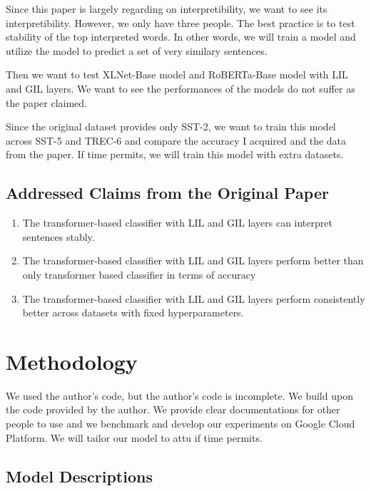 \documentclass{article}
\begin{document}
Since this paper is largely regarding on interpretibility, we want to see its interpretibility. However,
we only have three people. The best practice is to test stability of the top interpreted words.
In other words, we will train a model and utilize the model to predict a set of very similary sentences.

Then we want to test XLNet-Base model and RoBERTa-Base model with LIL and GIL layers. We want to see 
the performances of the models do not suffer as the paper claimed.

Since the original dataset provides only SST-2, we want to train this model across SST-5 and 
TREC-6 and compare the accuracy I acquired and the data from the paper. If time permits, we 
will train this model with extra datasets. 

\subsection{Addressed Claims from the Original Paper} \label{claims}

\begin{enumerate}
    \item The transformer-based classifier with LIL and GIL layers can interpret sentences stably.
    \item The transformer-based classifier with LIL and GIL layers perform better than only transformer
    based classifier in terms of accuracy
    \item The transformer-based classifier with LIL and GIL layers perform consistently better 
    across datasets with fixed hyperparameters.
\end{enumerate}


\section{Methodology}

We used the author's code, but the author's code is incomplete. We build upon the code 
provided by the author. We provide clear documentations for other people to use and we 
benchmark and develop our experiments on Google Cloud Platform. We will tailor our model
to attu if time permits.


\subsection{Model Descriptions}
\end{document}
